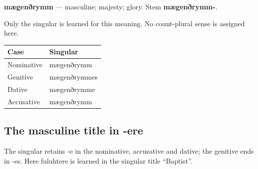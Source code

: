 \par\begin{minipage}{\linewidth}\raggedright
\textbf{mægenðrymm} — masculine; majesty; glory. Stem \textbf{mægenðrymm-}.

Only the singular is learned for this meaning. No count-plural sense is assigned here.

\par\begingroup
\fontsize{10.5}{13.2}\selectfont
\setlength{\LTleft}{0pt}\setlength{\LTright}{\fill}
\noindent
\begin{tabular}{@{}>{\raggedright\arraybackslash}p{55.09mm}>{\raggedright\arraybackslash}p{66.1mm}@{}}
\toprule
\textbf{Case} & \textbf{Singular} \\
\midrule
Nominative & mægenðrymm \\
Genitive & mægenðrymmes \\
Dative & mægenðrymme \\
Accusative & mægenðrymm \\
\bottomrule
\end{tabular}
\par\endgroup

\end{minipage}\par
{}
\subsection*{The masculine title in -ere}

The singular retains -e in the nominative, accusative and dative; the genitive ends in -es. Here fuluhtere is learned in the singular title “Baptist”.

